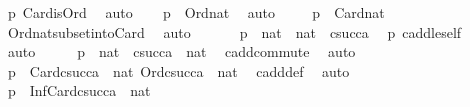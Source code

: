 \begin{isabellebody}
\ p{}\ Card{\isacharunderscore}{\kern0pt}is{\isacharunderscore}{\kern0pt}Ord\ \isamarkupfalse%
\ auto\isanewline
\ \ \isamarkupfalse%
\ p{}\ {\isacharcolon}{\kern0pt}\ {\isachardoublequoteopen}Ord{\isacharparenleft}{\kern0pt}nat{\isacharparenright}{\kern0pt}{\isachardoublequoteclose}\ \isamarkupfalse%
\ auto\ \isanewline
\ \ \isamarkupfalse%
\ p{}\ {\isacharcolon}{\kern0pt}\ {\isachardoublequoteopen}Card{\isacharparenleft}{\kern0pt}nat{\isacharparenright}{\kern0pt}{\isachardoublequoteclose}\ \isamarkupfalse%
\ Ord{\isacharunderscore}{\kern0pt}nat{\isacharunderscore}{\kern0pt}subset{\isacharunderscore}{\kern0pt}into{\isacharunderscore}{\kern0pt}Card\ \isamarkupfalse%
\ auto\ \isanewline
\ \ \isamarkupfalse%
\ \isamarkupfalse%
\ p{}\ {\isacharcolon}{\kern0pt}\ {\isachardoublequoteopen}nat\ {\isasymle}\ {\isacharparenleft}{\kern0pt}nat\ {\isasymoplus}\ csucc{\isacharparenleft}{\kern0pt}a{\isacharparenright}{\kern0pt}{\isacharparenright}{\kern0pt}{\isachardoublequoteclose}\ \isamarkupfalse%
\ p{}\ cadd{\isacharunderscore}{\kern0pt}le{\isacharunderscore}{\kern0pt}self\ \isamarkupfalse%
\ auto\isanewline
\ \ \isamarkupfalse%
\ \isamarkupfalse%
\ p{}\ {\isacharcolon}{\kern0pt}\ {\isachardoublequoteopen}nat\ {\isasymle}\ {\isacharparenleft}{\kern0pt}csucc{\isacharparenleft}{\kern0pt}a{\isacharparenright}{\kern0pt}\ {\isasymoplus}\ nat{\isacharparenright}{\kern0pt}{\isachardoublequoteclose}\ \isamarkupfalse%
\ cadd{\isacharunderscore}{\kern0pt}commute\ \isamarkupfalse%
\ auto\ \isanewline
\ \ \isamarkupfalse%
\ p{}\ {\isacharcolon}{\kern0pt}\ {\isachardoublequoteopen}Card{\isacharparenleft}{\kern0pt}csucc{\isacharparenleft}{\kern0pt}a{\isacharparenright}{\kern0pt}\ {\isasymoplus}\ nat{\isacharparenright}{\kern0pt}{\isachardoublequoteclose}\ {\isachardoublequoteopen}Ord{\isacharparenleft}{\kern0pt}csucc{\isacharparenleft}{\kern0pt}a{\isacharparenright}{\kern0pt}\ {\isasymoplus}\ nat{\isacharparenright}{\kern0pt}{\isachardoublequoteclose}\ \isamarkupfalse%
\ cadd{\isacharunderscore}{\kern0pt}def\ \isamarkupfalse%
\ auto\ \isanewline
\ \ \isamarkupfalse%
\ \isamarkupfalse%
\ p{}\ {\isacharcolon}{\kern0pt}\ {\isachardoublequoteopen}InfCard{\isacharparenleft}{\kern0pt}csucc{\isacharparenleft}{\kern0pt}a{\isacharparenright}{\kern0pt}\ {\isasymoplus}\ nat{\isacharparenright}{\kern0pt}{\isachardoublequoteclose}\ \isamarkupfalse%

\end{isabellebody}
